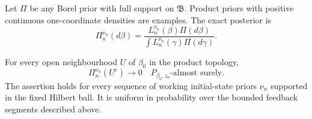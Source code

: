 Let \(\Pi\) be any Borel prior with full support on \(\mathfrak B\).  Product
priors with positive continuous one-coordinate densities are examples.  The
exact posterior is
\[
 \Pi_n^{\nu_n}(d\beta)
 =\frac{L_n^{\nu_n}(\beta)\Pi(d\beta)}
        {\int L_n^{\nu_n}(\gamma)\Pi(d\gamma)}.
\]

\begin{theorem}
\label{thm:jacobi-consistency}
For every open neighbourhood \(U\) of \(\beta_0\) in the product topology,
\begin{equation}
 \Pi_n^{\nu_n}(U^c)\longrightarrow0
 \quad P_{\beta_0,z_0}\text{-almost surely}.
 \label{eq:jacobi-consistency}
\end{equation}
The assertion holds for every sequence of working initial-state priors
\(\nu_n\) supported in the fixed Hilbert ball.  It is uniform in probability
over the bounded feedback segments described above.
\end{theorem}


